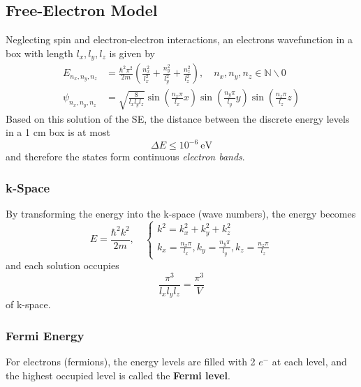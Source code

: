 \subsection{Free-Electron Model}
Neglecting spin and electron-electron interactions, an electrons wavefunction in a box with length $l_x,l_y,l_z$ is given by
\noindent\begin{align*}
    E_{n_x,n_y,n_z}    & = \frac{\hbar^2\pi^2}{2m}\left(\frac{n_x^2}{l_x^2}+\frac{n_y^2}{l_y^2}+\frac{n_z^2}{l_z^2}\right),\quad n_x,n_y,n_z \in \mathbb{N}\backslash 0 \\
    \psi_{n_x,n_y,n_z} & = \sqrt{\frac{8}{l_x l_y l_z}} \sin\left(\frac{n_x\pi}{l_x}x\right) \sin\left(\frac{n_y\pi}{l_y}y\right) \sin\left(\frac{n_z\pi}{l_z}z\right)
\end{align*}
Based on this solution of the SE, the distance between the discrete energy levels in a 1 cm box is at most
\noindent\begin{equation*}
    \Delta E \leq 10^{-6} ~\mathrm{eV}
\end{equation*}
and therefore the states form continuous \textit{electron bands}.


\subsubsection{k-Space}
By transforming the energy into the k-space (wave numbers), the energy becomes
\noindent\begin{equation*}
    E = \frac{\hbar^2k^2}{2m}, \quad \begin{cases}
        k^2 = k_x^2+k_y^2+k_z^2 \\
        k_x = \frac{n_x\pi}{l_x}, k_y = \frac{n_y\pi}{l_y}, k_z = \frac{n_z\pi}{l_z}
    \end{cases}
\end{equation*}
and each solution occupies
\noindent\begin{equation*}
    \frac{\pi^3}{l_x l_y l_z}=\frac{\pi^3}{V}
\end{equation*}
of k-space.

\subsubsection{Fermi Energy}
For electrons (fermions), the energy levels are filled with 2 $e^-$ at each level, and the highest occupied level is called the \textbf{Fermi level}.

